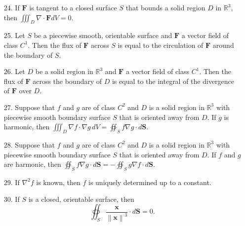 \documentclass[11pt,letterpaper,boxed]{hmcpset}
\newcommand{\R}{\mathbb{R}}
\newcommand{\magn}[1]{\left\lVert #1 \right\rVert}
\newcommand{\VEC}[1]{\ensuremath{\mathbf{#1}}\xspace}
\begin{document}
\begin{problem}
\begin{enumerate}
\item[24.] If $\VEC{F}$ is tangent to a closed surface $S$ that bounds a solid region $D$ in $\R^3$, then $\iiint_D \nabla\cdot \VEC{F}dV=0$.
\item[25.] Let $S$ be a piecewise smooth, orientable surface and $\VEC{F}$ a vector field of class $C^1$. Then the flux of $\VEC{F}$ across $S$ is equal
to the circulation of $\VEC{F}$ around the boundary of $S$.
\item[26.] Let $D$ be a solid region in $\R^3$ and $\VEC{F}$ a vector field of class $C^1$. Then the flux of $\VEC{F}$ across the boundary of $D$ is equal
to the integral of the divergence of $\VEC{F}$ over $D$.
\item[27.] Suppose that $f$ and $g$ are of class $C^2$ and $D$ is a solid region in $\R^3$ with piecewise smooth boundary surface $S$ that is oriented away from $D$. If
$g$ is harmonic, then $\iiint_D \nabla f\cdot \nabla g \, dV = \oiint_S f\nabla g\cdot d\VEC{S}.$
\item[28.] Suppose that $f$ and $g$ are of class $C^2$ and $D$ is a solid region in $\R^3$ with piecewise smooth boundary surface $S$ that is oriented away from $D$. If
$f$ and $g$ are harmonic, then $\oiint_S f\nabla g\cdot d\VEC{S}=-\oiint_Sg\nabla f\cdot d\VEC{S}.$
\item[29.] If $\nabla^2f$ is known, then $f$ is uniquely determined up to a constant.
\item[30.] If $S$ is a closed, orientable surface, then
\[
	\oiint_S \frac{\VEC{x}}{\magn{\VEC{x}}^3}\cdot d\VEC{S}=0.
\]
\end{enumerate}
\end{problem}

\begin{solution}
\vfill
\end{solution}
\newpage
\end{document}

